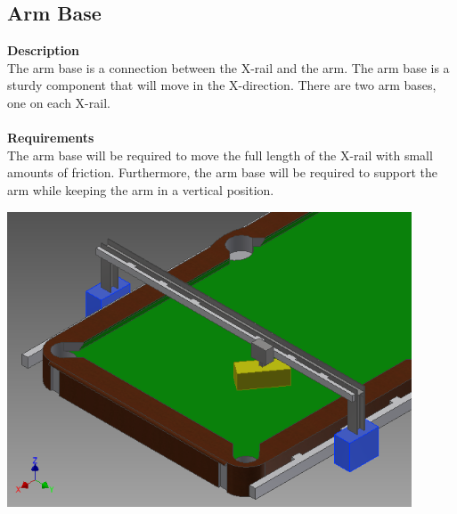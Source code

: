 \documentclass[titlepage]{article}
\begin{document}
\subsection{Arm Base}
\textbf{Description}\\
The arm base is a connection between the X-rail and the arm. The arm base is a sturdy component that will move in the X-direction. There are two arm bases, one on each X-rail.\\\\
\textbf{Requirements}\\
The arm base will be required to move the full length of the X-rail with small amounts of friction. Furthermore, the arm base will be required to support the arm while keeping the arm in a vertical position.
\begin{center}
	\includegraphics[width = 0.9\textwidth]{armBase.png}
\label{fig:armBaseFig}
\end{center}

\newpage
\end{document}
